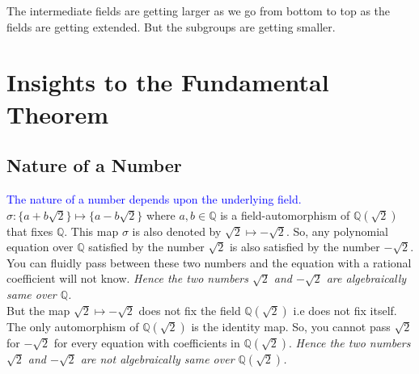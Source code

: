 \vspace{5mm}
\begin{remark}
  The intermediate fields are getting larger as we go from bottom to top as the fields are getting extended. But the subgroups are getting smaller.
\end{remark}

\vspace{7mm}
\section{Insights to the Fundamental Theorem}

\subsection{Nature of a Number}
\textcolor{blue}{The nature of a number depends upon the underlying field.} \\
\(\sigma:\{a+b\sqrt{2}\} \mapsto \{a-b\sqrt{2}\}\) where \(a,b \in \mathbb{Q}\) is a field-automorphism of  \(\mathbb{Q}(\sqrt{2})\) that fixes \(\mathbb{Q}\). This map \(\sigma \) is also denoted by \(\sqrt{2} \longmapsto -\sqrt{2}\). So, any polynomial equation over \(\mathbb{Q}\) satisfied by the number \(\sqrt{2}\) is also satisfied by the number \(-\sqrt{2}\). You can fluidly pass between these two numbers and the equation with a rational coefficient will not know. \textit{Hence the two numbers \(\sqrt{2}\) and \(-\sqrt{2}\) are algebraically same over \(\mathbb{Q}\).}\\

But the map \(\sqrt{2} \longmapsto -\sqrt{2}\) does not fix the field \(\mathbb{Q}(\sqrt{2})\) i.e does not fix itself. The only automorphism of \(\mathbb{Q}(\sqrt{2})\) is the identity map. So, you cannot pass \(\sqrt{2}\) for \(-\sqrt{2}\) for every equation with coefficients in \(\mathbb{Q}(\sqrt{2})\). \textit{Hence the two numbers \(\sqrt{2}\) and \(-\sqrt{2}\) are not algebraically same over \(\mathbb{Q}(\sqrt{2})\).}
\vspace{7mm}

\begin{figure}[h]
  \centering
    \end{figure}

